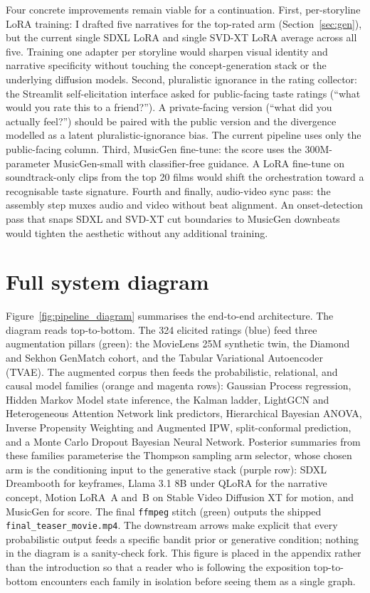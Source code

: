 \documentclass{article}
\begin{document}
Four concrete improvements remain viable for a continuation. First, per-storyline LoRA training: I drafted five narratives for the top-rated arm (Section~\ref{sec:gen}), but the current single SDXL LoRA and single SVD-XT LoRA average across all five. Training one adapter per storyline would sharpen visual identity and narrative specificity without touching the concept-generation stack or the underlying diffusion models. Second, pluralistic ignorance in the rating collector: the Streamlit self-elicitation interface asked for public-facing taste ratings (``what would you rate this to a friend?''). A private-facing version (``what did you actually feel?'') should be paired with the public version and the divergence modelled as a latent pluralistic-ignorance bias. The current pipeline uses only the public-facing column. Third, MusicGen fine-tune: the score uses the 300M-parameter MusicGen-small with classifier-free guidance. A LoRA fine-tune on soundtrack-only clips from the top 20 films would shift the orchestration toward a recognisable taste signature. Fourth and finally, audio-video sync pass: the assembly step muxes audio and video without beat alignment. An onset-detection pass that snaps SDXL and SVD-XT cut boundaries to MusicGen downbeats would tighten the aesthetic without any additional training.

\section{Full system diagram}
\label{sec:system-diagram}

Figure~\ref{fig:pipeline_diagram} summarises the end-to-end architecture. The diagram reads top-to-bottom. The 324 elicited ratings (blue) feed three augmentation pillars (green): the MovieLens 25M synthetic twin, the Diamond and Sekhon GenMatch cohort, and the Tabular Variational Autoencoder (TVAE). The augmented corpus then feeds the probabilistic, relational, and causal model families (orange and magenta rows): Gaussian Process regression, Hidden Markov Model state inference, the Kalman ladder, LightGCN and Heterogeneous Attention Network link predictors, Hierarchical Bayesian ANOVA, Inverse Propensity Weighting and Augmented IPW, split-conformal prediction, and a Monte Carlo Dropout Bayesian Neural Network. Posterior summaries from these families parameterise the Thompson sampling arm selector, whose chosen arm is the conditioning input to the generative stack (purple row): SDXL Dreambooth for keyframes, Llama 3.1 8B under QLoRA for the narrative concept, Motion LoRA~A and~B on Stable Video Diffusion XT for motion, and MusicGen for score. The final \texttt{ffmpeg} stitch (green) outputs the shipped \texttt{final\_teaser\_movie.mp4}. The downstream arrows make explicit that every probabilistic output feeds a specific bandit prior or generative condition; nothing in the diagram is a sanity-check fork. This figure is placed in the appendix rather than the introduction so that a reader who is following the exposition top-to-bottom encounters each family in isolation before seeing them as a single graph.
\end{document}
